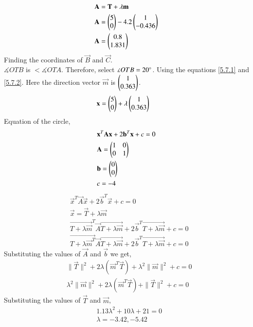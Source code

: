 \documentclass[journal,12pt,twocolumn]{IEEEtran}
\renewcommand\thesection{\arabic{section}}
\begin{document}
\begin{enumerate}[label=\thesection.\arabic*.,ref=\thesection.\theenumi]
\begin{align}
& \mathbf{A} = \mathbf{T} +\lambda\mathbf{m}\\
& \mathbf{A} = \begin{pmatrix}5\\0\end{pmatrix} -4.2\begin{pmatrix}1\\-0.436\end{pmatrix}\\
& \mathbf{A} = \begin{pmatrix}0.8\\1.831\end{pmatrix}
\end{align}
Finding the coordinates of $\vec{B}$ and $\vec{C}$.\\
$\measuredangle{OTB}$ is $< \measuredangle{OTA}$. Therefore, select $\measuredangle{OTB} = 20\degree$. Using the equations \eqref{5.7.1} and \eqref{5.7.2}. Here the direction vector $\vec{m}$ is $\begin{pmatrix}1\\0.363\end{pmatrix}$.\\
\begin{align}& \vec{x} = \myvec{5\\0} +\lambda\myvec{1\\0.363}\end{align}
Equation of the circle,
\begin{align}
& \mathbf{x}^T\mathbf{A}\mathbf{x} +2\mathbf{b}^T\mathbf{x}+c=0\\ \label{5.7.2-second}
&\mathbf{A} = \begin{pmatrix}1&0\\0&1\end{pmatrix}\\
&\mathbf{b} = \begin{pmatrix}0\\0\end{pmatrix}\\
&c = -4
\end{align}
\begin{align}
& \vec{x}^T\vec{A}\vec{x} +2\vec{b}^T\vec{x}+c=0\\
& \vec{x} = \vec{T} +\lambda\vec{m} \\
& \vec{T+\lambda\vec{m}}^T\vec{A}\vec{T+\lambda\vec{m}} +2\vec{b}^T \vec{T+\lambda\vec{m}}+c = 0 \\
& \vec{T+\lambda\vec{m}^T}\vec{A}\vec{T+\lambda\vec{m}} +2\vec{b}^T \vec{T+\lambda\vec{m}}+c = 0
\end{align}
Substituting the values of $\vec{A}$ and $\vec{b}$ we get,
\begin{align}
& \|\vec{T}\|^2+2\lambda(\vec{m}^T\vec{T})+\lambda^2\|\vec{m}\|^2+c = 0 \\
& \lambda^2\|\vec{m}\|^2 +2\lambda(\vec{m}^T\vec{T}) + \|\vec{T}\|^2 + c = 0
\end{align}
Substituting the values of $\vec{T}$ and $\vec{m}$,
\begin{align}
&1.13\lambda^2 +10\lambda +21 = 0\\
&\lambda = -3.42,-5.42
\end{align}

\end{enumerate}
\end{document}
